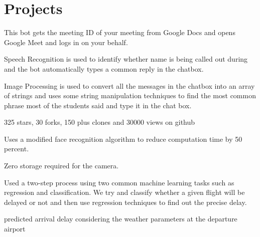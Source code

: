 \documentclass[]{deedy-resume-reversed}
\begin{document}
\begin{minipage}[t]{0.60\textwidth}

\section{Projects}
\begin{tightemize}
\item This bot gets the meeting ID of your meeting from Google Docs and opens Google Meet and logs in on your behalf.
\item Speech Recognition is used to identify whether name is being called out during  and the bot automatically types a common reply in the chatbox.
\item Image Processing is used to convert all the messages in the chatbox into an array of strings and uses some string manipulation techniques to find the most common phrase most of the students said and type it in the chat box.
\item 325 stars, 30 forks, 150 plus clones and 30000 views on github
\end{tightemize}
\sectionsep

\begin{tightemize}
\item  Uses a modified face recognition algorithm to reduce computation time by 50 percent.
\item  Zero storage required for the camera.

\end{tightemize}
\sectionsep


\begin{tightemize}
\item  Used a two-step process using two common machine learning tasks such as regression and classification. We try and classify whether a given flight will be delayed or not and then use regression techniques to find out the precise delay.
\item  predicted arrival delay considering the weather parameters at the departure airport

\end{tightemize}
\sectionsep


\end{minipage}
\end{document}

